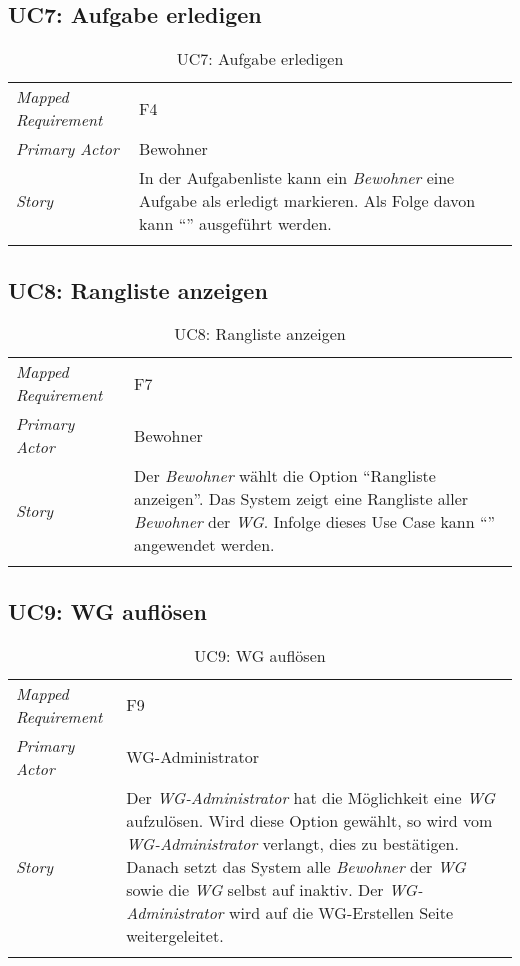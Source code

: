 \subsection{UC7: Aufgabe erledigen}\label{subsec:uc7}
\begin{table}[H]
	\tablestyle
	\tablealtcolored
	\begin{tabularx}{\textwidth}{lX}
		\tablebody
			\textit{Mapped Requirement} &
			F4
			\tabularnewline
			\textit{Primary Actor} &
			Bewohner
			\tabularnewline
			\textit{Story} &
			In der Aufgabenliste kann ein \emph{Bewohner} eine Aufgabe als erledigt markieren.
			\newline Als Folge davon kann ``\nameref{subsec:uc11}'' ausgeführt werden.
			\tabularnewline
		\tableend
	\end{tabularx}
	\caption{UC7: Aufgabe erledigen}
\end{table}


\subsection{UC8: Rangliste anzeigen}\label{subsec:uc8}
\begin{table}[H]
	\tablestyle
	\tablealtcolored
	\begin{tabularx}{\textwidth}{lX}
		\tablebody
			\textit{Mapped Requirement} &
			F7
			\tabularnewline
			\textit{Primary Actor} &
			Bewohner
			\tabularnewline
			\textit{Story} &
			Der \emph{Bewohner} wählt die Option ``Rangliste anzeigen''. Das System zeigt eine Rangliste aller \emph{Bewohner} der \emph{WG}.
			\newline Infolge dieses Use Case kann ``\nameref{subsec:uc11}'' angewendet werden.
			\tabularnewline
		\tableend
	\end{tabularx}
	\caption{UC8: Rangliste anzeigen}
\end{table}


\subsection{UC9: WG auflösen}\label{subsec:uc9}
\begin{table}[H]
	\tablestyle
	\tablealtcolored
	\begin{tabularx}{\textwidth}{lX}
		\tablebody
			\textit{Mapped Requirement} &
			F9
			\tabularnewline
			\textit{Primary Actor} &
			WG-Administrator
			\tabularnewline
			\textit{Story} &
			Der \emph{WG-Administrator} hat die Möglichkeit eine \emph{WG} aufzulösen. Wird diese Option gewählt, so wird vom \emph{WG-Administrator} verlangt, dies zu bestätigen. Danach setzt das System alle \emph{Bewohner} der \emph{WG} sowie die \emph{WG} selbst auf inaktiv. Der \emph{WG-Administrator} wird auf die WG-Erstellen Seite weitergeleitet.
			\tabularnewline
		\tableend
	\end{tabularx}
	\caption{UC9: WG auflösen}
\end{table}


